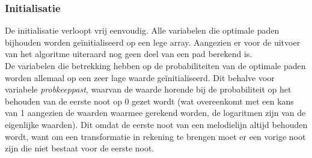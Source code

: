 \subsubsection{Initialisatie}
De initialisatie verloopt vrij eenvoudig. Alle variabelen die optimale paden bijhouden worden ge\"initialiseerd op een lege array. Aangezien er voor de uitvoer van het algoritme uiteraard nog geen deel van een pad berekend is.\\ 
De variabelen die betrekking hebben op de probabiliteiten van de optimale paden worden allemaal op een zeer lage waarde ge\"initialiseerd. Dit behalve voor variabele \textit{prob\textunderscore keep\textunderscore past}, waarvan de waarde horende bij de probabiliteit op het behouden van de eerste noot op 0 gezet wordt (wat overeenkomt met een kans van 1 aangezien de waarden waarmee gerekend worden, de logaritmen zijn van de eigenlijke waarden). Dit omdat de eerste noot van een melodielijn altijd behouden wordt, want om een transformatie in rekening te brengen moet er een vorige noot zijn die niet bestaat voor de eerste noot.

